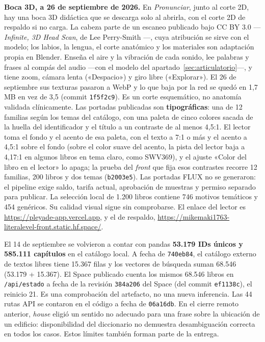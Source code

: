 \documentclass[11pt,a4paper]{article}
\newcommand{\cod}[1]{\texttt{\small #1}}
\begin{document}
\noindent\textbf{Boca 3D, a 26 de septiembre de 2026.} En \emph{Pronunciar}, junto al corte 2D, hay una boca 3D didáctica que se descarga solo al abrirla, con el corte 2D de respaldo si no carga. La cabeza parte de un escaneo publicado bajo CC BY 3.0 ---\emph{Infinite, 3D Head Scan}, de Lee Perry-Smith \parencite{perrysmith_infinite}---, cuya atribución se sirve con el modelo; los labios, la lengua, el corte anatómico y los materiales son adaptación propia en Blender. Enseña el aire y la vibración de cada sonido, lee palabras y frases al compás del audio ---con el modelo del apartado~\ref{sec:articulatorio}---, y tiene zoom, cámara lenta («Despacio») y giro libre («Explorar»). El 26 de septiembre sus texturas pasaron a WebP y lo que baja por la red se quedó en 1,7 MB en vez de 3,5 (commit \cod{1f5f2c9}). Es un corte esquemático, no anatomía validada clínicamente. Las portadas publicadas son \textbf{tipográficas}: una de 12 familias según los temas del catálogo, con una paleta de cinco colores sacada de la huella del identificador y el título a un contraste de al menos 4,5:1. El lector toma el fondo y el acento de esa paleta, con el texto a 7:1 o más y el acento a 4,5:1 sobre el fondo (sobre el color suave del acento, la pista del lector baja a 4,17:1 en algunos libros en tema claro, como SWV369), y el ajuste «Color del libro en el lector» lo apaga; la prueba del \emph{front} que fija esos contrastes recorre 12 familias, 200 libros y dos temas (\cod{b2003e5}). Las portadas FLUX no se generaron: el pipeline
exige saldo, tarifa actual, aprobación de muestras y permiso separado para publicar.
La selección local de 1.200 libros contiene 746 motivos temáticos y 454 genéricos.
Su calidad visual sigue sin comprobarse. El enlace del lector es
\url{https://pleyade-app.vercel.app}, y el de respaldo,
\url{https://mikemaki1763-literalevel-front.static.hf.space/}.

El 14 de septiembre se volvieron a contar con pandas \textbf{53.179 IDs únicos y 585.111 capítulos} en el catálogo local. A fecha de \cod{740eb84}, el catálogo externo de textos libres tiene 15.367 filas y los vectores de búsqueda suman 68.546 (53.179 + 15.367). El Space publicado cuenta los mismos 68.546 libros en \cod{/api/estado} a fecha de la revisión \cod{384a206} del Space (del commit \cod{ef1138c}), el reinicio 21. Es una comprobación del artefacto, no una
nueva inferencia. Las 44 rutas API se contaron en el código a fecha de \cod{06a16db}. En el cierre remoto
anterior, \emph{house} eligió un sentido no adecuado para una frase sobre la ubicación
de un edificio: disponibilidad del diccionario no demuestra desambiguación correcta
en todos los casos. Estos límites también forman parte de la entrega.
\end{document}

